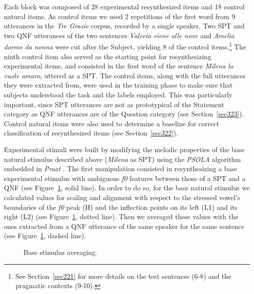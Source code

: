 Each block was composed of 28 experimental resynthesized items and 18 control natural items. As control items we used 2 repetitions of the first word from 9 utterances in the \textit{Tre Grazie} corpus, recorded by a single speaker. Two SPT and two QNF utterances of the two sentences \textit{Valeria viene alle nove} and \textit{Amelia dorme da nonna} were cut after the Subject, yielding 8 of the control items.\footnote{See Section~\ref{sec221} for more details on the test sentences (6-8) and the pragmatic contexts (9-10).} The ninth control item also served as the starting point for resynthesizing experimental items, and consisted in the first word of the sentence \textit{Milena lo vuole amaro}, uttered as a SPT. The control items, along with the full utterances they were extracted from, were used in the training phase to make sure that subjects understood the task and the labels employed. This was particularly important, since SPT utterances are not as prototypical of the Statement category as QNF utterances are of the Question category (see Section~\ref{sec323}). Control natural items were also used to determine a baseline for correct classification of resynthesized items (see Section~\ref{sec322}). 

Experimental stimuli were built by modifying the melodic properties of the base natural stimulus described above (\textit{Milena} as SPT) using the \textit{PSOLA} algorithm \citep{moulines1990pitchsyncronous} embedded in \textit{Praat} \citep{boersma2008praat}. The first manipulation consisted in resynthesizing a base experimental stimulus with ambiguous \textit{f0} features between those of a SPT and a QNF (see Figure~\ref{fig303}, solid line). In order to do so, for the base natural stimulus we calculated values for scaling and alignment with respect to the stressed vowel’s boundaries of the \textit{f0} peak (H) and the inflection points on its left (L1) and its right (L2) (see Figure~\ref{fig303}, dotted line). Then we averaged these values with the ones extracted from a QNF utterance of the same speaker for the same sentence (see Figure~\ref{fig303}, dashed line). 

\begin{figure}
\centering
{}
\caption{Base stimulus averaging.}
\label{fig303}\end{figure}


